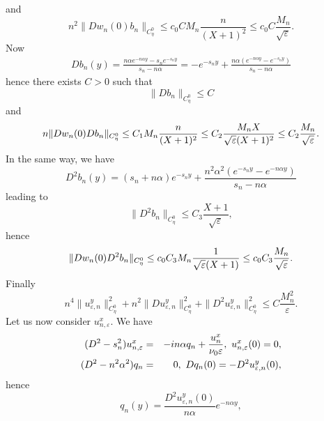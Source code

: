 \documentclass[11pt]{article}
\begin{document}
and 
\begin{equation*}
n^{2}\|Dw_{n}(0)b_{n}\|_{C_{\eta}^{0}}\leq c_{0}CM_{n}\frac{n}{(X+1)^{2}}\leq
c_{0}C\frac{M_{n}}{\sqrt{\varepsilon }}.
\end{equation*}%
Now 
\begin{eqnarray*}
Db_{n}(y) =\frac{n\alpha e^{-n\alpha y}-s_{n}e^{-s_{n}y}}{s_{n}-n\alpha }
=-e^{-s_{n}y}+\frac{n\alpha (e^{-n\alpha y}-e^{-s_{n}y})}{s_{n}-n\alpha }
\end{eqnarray*}%
hence there exists $C>0$ such that%
\begin{equation*}
\|Db_{n}\|_{C_{\eta}^{0}}\leq C
\end{equation*}%
and%
\begin{equation*}
n\|Dw_{n}(0)Db_{n}\|_{C_{\eta}^{0}}\leq C_{1}M_{n}\frac{n}{(X+1)^{2}}\leq C_{2}%
\frac{M_{n}X}{\sqrt{\varepsilon }(X+1)^{2}}\leq C_{2}\frac{M_{n}}{\sqrt{%
\varepsilon }}.
\end{equation*}%
In the same way, we have%
\begin{equation*}
D^{2}b_{n}(y)=(s_{n}+n\alpha )e^{-s_{n}y}+\frac{n^{2}\alpha
^{2}(e^{-s_{n}y}-e^{-n\alpha y})}{s_{n}-n\alpha }
\end{equation*}%
leading to%
\begin{equation*}
\|D^{2}b_{n}\|_{C_{\eta}^{0}}\leq C_{3}\frac{X+1}{\sqrt{\varepsilon }},
\end{equation*}%
hence%
\begin{equation*}
\|Dw_{n}(0)D^{2}b_{n}\|_{C_{\eta}^{0}}\leq c_{0}C_{3}M_{n}\frac{1}{\sqrt{%
\varepsilon }(X+1)}\leq c_{0}C_{3}\frac{M_{n}}{\sqrt{\varepsilon }}.
\end{equation*}%
Finally%
\begin{equation*}
n^{4}\|u_{\varepsilon ,n}^{y}\|_{C_{\eta}^{0}}^{2}+n^{2}\|Du_{\varepsilon
,n}^{y}\|_{C_{\eta}^{0}}^{2}+\|D^{2}u_{\varepsilon
,n}^{y}\|_{C_{\eta}^{0}}^{2}\leq C\frac{M_{n}^{2}}{\varepsilon }.
\end{equation*}
Let us now consider $u_{n,\varepsilon }^{x}.$ We have%
\begin{eqnarray*}
(D^{2}-s_{n}^{2})u_{n,\varepsilon }^{x} &=&-in\alpha q_{n}+\frac{u_{n}^{x}}{%
\nu _{0}\varepsilon },\text{ }u_{n,\varepsilon }^{x}(0)=0, \\
(D^{2}-n^{2}\alpha ^{2})q_{n} &=&0,\text{ }Dq_{n}(0)=-D^{2}u_{\varepsilon
,n}^{y}(0),
\end{eqnarray*}%
hence%
\begin{equation*}
q_{n}(y)=\frac{D^{2}u_{\varepsilon ,n}^{y}(0)}{n\alpha }e^{-n\alpha y},
\end{equation*}%
\end{document}
